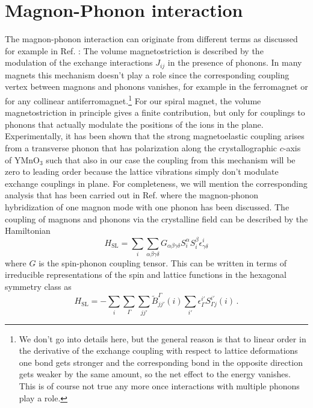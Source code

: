 \documentclass[aps,prl,twocolumn,superscriptaddress,amsmath,amssymb,floats,aps,10pt]{revtex4-1}
\begin{document}
\section{Magnon-Phonon interaction}
The magnon-phonon interaction can originate from different terms as discussed for example in Ref. \cite{Boiteux72}:
The volume magnetostriction is described by the modulation of the exchange interactions $J_{ij}$
in the presence of phonons. In many magnets this mechanism doesn't play a role since the corresponding
coupling vertex between magnons and phonons vanishes, for example in the ferromagnet\cite{Rueckriegel14} or for
any collinear antiferromagnet.\footnote{We don't go into details here, but the general reason is that to linear order in the
derivative of the exchange coupling with respect to lattice deformations one bond gets stronger and the corresponding bond in
the opposite direction gets weaker by the same amount, so the net effect to the energy vanishes. This is of course not true
any more once interactions with multiple phonons play a role.}
For our spiral magnet, the volume magnetostriction in principle gives a finite contribution\cite{Kreisel11},
but only for couplings to phonons that actually modulate the positions of the ions in the plane.
Experimentally, it has been shown that the strong magnetoelastic coupling arises from
a transverse phonon that has polarization along the crystallographic $c$-axis of YMnO$_3$\cite{Pailhes09,Petit2007}
such that also in our case the coupling from this mechanism will be zero to leading order because
the lattice vibrations simply don't modulate exchange couplings in plane.
For completeness, we will mention the corresponding analysis that has been carried
out in Ref. \cite{Kim07} where the magnon-phonon hybridization of one magnon mode with one phonon has been discussed.
The coupling of magnons and phonons via the crystalline field can be described by
the Hamiltonian\cite{Laurence73,Boiteux72}
\begin{equation}
 H_{\text{SL}}=\sum_i \sum_{\alpha\beta\gamma\delta} G_{\alpha\beta\gamma\delta} S^\alpha_iS^\beta_i \epsilon_{\gamma\delta}^i
\end{equation}
where $G$ is the spin-phonon coupling tensor.
This can be written in terms of irreducible representations of the spin and lattice functions in the hexagonal symmetry class as\cite{Callen65}
\begin{equation}
 H_{\text{SL}}=-\sum_{i}\sum_{\Gamma}\sum_{jj'} \tilde B_{jj'}^\Gamma(i) \sum_{i'}\epsilon_\Gamma^{i'} S_{\Gamma j}^{i'}(i)\,.
\end{equation}
\end{document}
